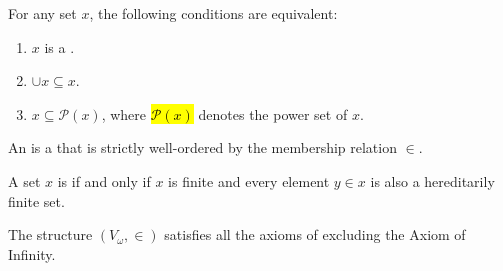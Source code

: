 

\begin{proposition}
For any set $x$, the following conditions are equivalent:
\begin{enumerate}
    \item $x$ is a .
    \item $\cup x \subseteq x$.
    \item $x \subseteq \mathcal{P}(x)$, where \hl{$\mathcal{P}(x)$} denotes the power set of $x$.
\end{enumerate}
\end{proposition}



\begin{theorem}
An  is a  that is strictly well-ordered by the membership relation $\in$. 
\end{theorem}





\begin{theorem}
A set $x$ is  if and only if $x$ is finite and every element $y \in x$ is also a hereditarily finite set.
\end{theorem}

\begin{proposition}
The structure $(V_\omega, \in)$ satisfies all the axioms of  excluding the Axiom of Infinity.
\end{proposition}











